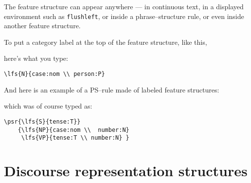\documentclass{article}
\begin{document}
The feature structure can appear anywhere --- in continuous text, in a
displayed environment such as \texttt{flushleft}, or inside a
phrase--structure rule, or even inside another feature structure.

To put a category label at the top of the feature structure, like this,
\begin{flushleft}
\end{flushleft}
here's what you type:
\begin{verbatim}
\lfs{N}{case:nom \\ person:P}
\end{verbatim}
And here is an example of a PS--rule made of labeled feature structures:
\begin{flushleft}
    {
      }
\end{flushleft}
which was of course typed as:
\begin{verbatim}
\psr{\lfs{S}{tense:T}}
    {\lfs{NP}{case:nom \\  number:N}
     \lfs{VP}{tense:T \\ number:N} }
\end{verbatim}


\section{Discourse representation structures}
\end{document}
